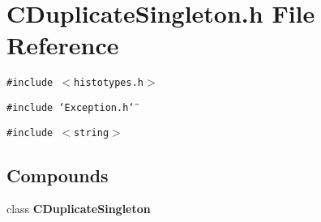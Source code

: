 \section{CDuplicate\-Singleton.h File Reference}
\label{CDuplicateSingleton_8h}
{\tt \#include $<$histotypes.h$>$}\par
{\tt \#include \char`\"{}Exception.h\char`\"{}}\par
{\tt \#include $<$string$>$}\par
\subsection*{Compounds}
\begin{CompactItemize}
\item 
class {\bf CDuplicate\-Singleton}
\end{CompactItemize}

